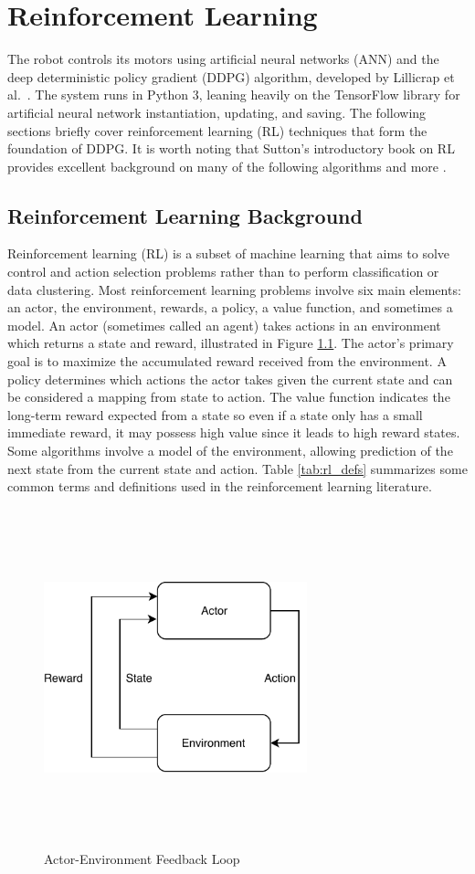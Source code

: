 \chapter{Reinforcement Learning}
The robot controls its motors using artificial neural networks (ANN) and the deep deterministic policy gradient (DDPG) algorithm, developed by Lillicrap et al.\ \cite{lillicrap_2016}. The system runs in Python 3, leaning heavily on the TensorFlow library \cite{tensorflow} for artificial neural network instantiation, updating, and saving. The following sections briefly cover reinforcement learning (RL) techniques that form the foundation of DDPG. It is worth noting that Sutton's introductory book on RL provides excellent background on many of the following algorithms and more \cite{sutton_2017}.

\section{Reinforcement Learning Background}
Reinforcement learning (RL) is a subset of machine learning that aims to solve control and action selection problems rather than to perform classification or data clustering. Most reinforcement learning problems involve six main elements: an actor, the environment, rewards, a policy, a value function, and sometimes a model. An actor (sometimes called an agent) takes actions in an environment which returns a state and reward, illustrated in Figure \ref{fig:actor_env_loop}. The actor's primary goal is to maximize the accumulated reward received from the environment. A policy determines which actions the actor takes given the current state and can be considered a mapping from state to action. The value function indicates the long-term reward expected from a state so even if a state only has a small immediate reward, it may possess high value since it leads to high reward states. Some algorithms involve a model of the environment, allowing prediction of the next state from the current state and action. Table \ref{tab:rl_defs} summarizes some common terms and definitions used in the reinforcement learning literature.
\begin{figure}[H]   %
	\centering \includegraphics[width=3in, height=3.85in, keepaspectratio]{figures/actor_env_loop.pdf}
	\caption{Actor-Environment Feedback Loop}\label{fig:actor_env_loop}
\end{figure}
